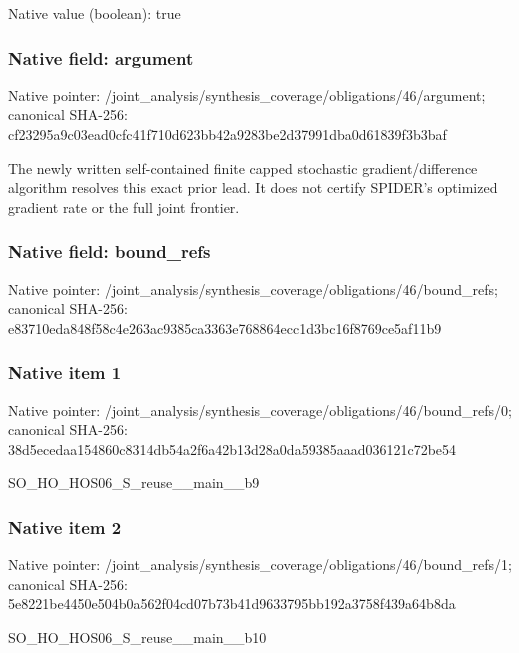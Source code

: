 \documentclass[10pt,a4paper]{article}
\begin{document}
Native value (boolean): true

\subsubsection{Native field: argument}
Native pointer: /joint\_\allowbreak{}analysis/synthesis\_\allowbreak{}coverage/obligations/46/argument; canonical SHA-256: cf23295a9c03ead0cfc41f710d623bb42a9283be2d37991dba0d61839f3b3baf

\begingroup\raggedright\sloppy The newly written self-contained finite capped stochastic gradient/\allowbreak{}difference algorithm resolves this exact prior lead. It does not certify SPIDER's optimized gradient rate or the full joint frontier.\par\endgroup

\subsubsection{Native field: bound\_\allowbreak{}refs}
Native pointer: /joint\_\allowbreak{}analysis/synthesis\_\allowbreak{}coverage/obligations/46/bound\_\allowbreak{}refs; canonical SHA-256: e83710eda848f58c4e263ac9385ca3363e768864ecc1d3bc16f8769ce5af11b9

\subsubsection{Native item 1}
Native pointer: /joint\_\allowbreak{}analysis/synthesis\_\allowbreak{}coverage/obligations/46/bound\_\allowbreak{}refs/0; canonical SHA-256: 38d5ecedaa154860c8314db54a2f6a42b13d28a0da59385aaad036121c72be54

\begingroup\raggedright\sloppy SO\_\allowbreak{}HO\_\allowbreak{}HOS06\_\allowbreak{}S\_\allowbreak{}reuse\_\allowbreak{}\_\allowbreak{}main\_\allowbreak{}\_\allowbreak{}b9\par\endgroup

\subsubsection{Native item 2}
Native pointer: /joint\_\allowbreak{}analysis/synthesis\_\allowbreak{}coverage/obligations/46/bound\_\allowbreak{}refs/1; canonical SHA-256: 5e8221be4450e504b0a562f04cd07b73b41d9633795bb192a3758f439a64b8da

\begingroup\raggedright\sloppy SO\_\allowbreak{}HO\_\allowbreak{}HOS06\_\allowbreak{}S\_\allowbreak{}reuse\_\allowbreak{}\_\allowbreak{}main\_\allowbreak{}\_\allowbreak{}b10\par\endgroup
\end{document}
